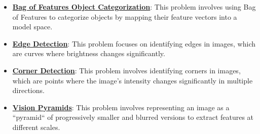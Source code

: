\documentclass{article}%
\begin{document}
\begin{itemize}[leftmargin=*]%
\item \href{https://purdue.brightspace.com/d2l/common/assets/pdfjs-d2l-dist/1.0.14-legacy/web/viewer.html?file=\%2Fcontent\%2Fenforced\%2F1095467-wl.202510.CS.24300.001\%2F08L2-Feature Extraction.pdf\%3Fou\%3D1095467\&lang=en-us\&container=d2l-fileviewer-rendered-pdf\&fullscreen=d2l-fileviewer-rendered-pdf-dialog\&height=667#page=3}{\textbf{Bag of Features Object Categorization}}: This problem involves using Bag of Features to categorize objects by mapping their feature vectors into a model space.%
\item \href{https://purdue.brightspace.com/d2l/common/assets/pdfjs-d2l-dist/1.0.14-legacy/web/viewer.html?file=\%2Fcontent\%2Fenforced\%2F1095467-wl.202510.CS.24300.001\%2F08L2-Feature Extraction.pdf\%3Fou\%3D1095467\&lang=en-us\&container=d2l-fileviewer-rendered-pdf\&fullscreen=d2l-fileviewer-rendered-pdf-dialog\&height=667#page=4}{\textbf{Edge Detection}}: This problem focuses on identifying edges in images, which are curves where brightness changes significantly.%
\item \href{https://purdue.brightspace.com/d2l/common/assets/pdfjs-d2l-dist/1.0.14-legacy/web/viewer.html?file=\%2Fcontent\%2Fenforced\%2F1095467-wl.202510.CS.24300.001\%2F08L2-Feature Extraction.pdf\%3Fou\%3D1095467\&lang=en-us\&container=d2l-fileviewer-rendered-pdf\&fullscreen=d2l-fileviewer-rendered-pdf-dialog\&height=667#page=20}{\textbf{Corner Detection}}: This problem involves identifying corners in images, which are points where the image's intensity changes significantly in multiple directions.%
\item \href{https://purdue.brightspace.com/d2l/common/assets/pdfjs-d2l-dist/1.0.14-legacy/web/viewer.html?file=\%2Fcontent\%2Fenforced\%2F1095467-wl.202510.CS.24300.001\%2F08L2-Feature Extraction.pdf\%3Fou\%3D1095467\&lang=en-us\&container=d2l-fileviewer-rendered-pdf\&fullscreen=d2l-fileviewer-rendered-pdf-dialog\&height=667#page=30}{\textbf{Vision Pyramids}}: This problem involves representing an image as a ``pyramid`` of progressively smaller and blurred versions to extract features at different scales.%
\end{itemize}%
\end{document}
